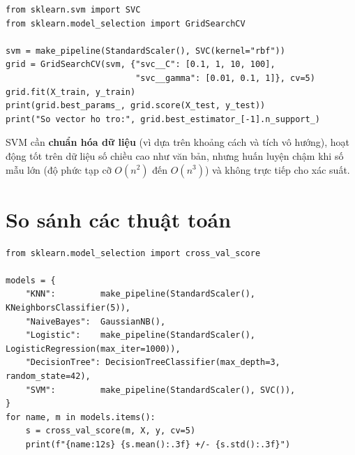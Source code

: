 
\begin{lstlisting}[caption={SVM với tìm kiếm tham số C và gamma}]
from sklearn.svm import SVC
from sklearn.model_selection import GridSearchCV

svm = make_pipeline(StandardScaler(), SVC(kernel="rbf"))
grid = GridSearchCV(svm, {"svc__C": [0.1, 1, 10, 100],
                          "svc__gamma": [0.01, 0.1, 1]}, cv=5)
grid.fit(X_train, y_train)
print(grid.best_params_, grid.score(X_test, y_test))
print("So vector ho tro:", grid.best_estimator_[-1].n_support_)
\end{lstlisting}

SVM cần \textbf{chuẩn hóa dữ liệu} (vì dựa trên khoảng cách và tích vô hướng), hoạt động tốt trên dữ liệu số chiều cao như văn bản, nhưng huấn luyện chậm khi số mẫu lớn (độ phức tạp cỡ $O(n^2)$ đến $O(n^3)$) và không trực tiếp cho xác suất.

\section{So sánh các thuật toán}

\begin{lstlisting}[caption={So sánh năm thuật toán bằng kiểm định chéo}]
from sklearn.model_selection import cross_val_score

models = {
    "KNN":         make_pipeline(StandardScaler(), KNeighborsClassifier(5)),
    "NaiveBayes":  GaussianNB(),
    "Logistic":    make_pipeline(StandardScaler(), LogisticRegression(max_iter=1000)),
    "DecisionTree": DecisionTreeClassifier(max_depth=3, random_state=42),
    "SVM":         make_pipeline(StandardScaler(), SVC()),
}
for name, m in models.items():
    s = cross_val_score(m, X, y, cv=5)
    print(f"{name:12s} {s.mean():.3f} +/- {s.std():.3f}")
\end{lstlisting}

